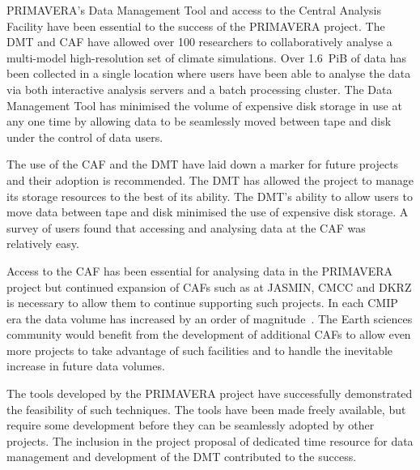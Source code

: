 \documentclass[gmd, manuscript]{copernicus}
\begin{document}
\conclusions  %

PRIMAVERA's Data Management Tool and access to the Central Analysis Facility have been essential to the success of the PRIMAVERA project. The DMT and CAF have allowed over 100 researchers to collaboratively analyse a multi-model high-resolution set of climate simulations. Over 1.6~PiB of data has been collected in a single location where users have been able to analyse the data via both interactive analysis servers and a batch processing cluster. The Data Management Tool has minimised the volume of expensive disk storage in use at any one time by allowing data to be seamlessly moved between tape and disk under the control of data users.

The use of the CAF and the DMT have laid down a marker for future projects and their adoption is recommended. The DMT has allowed the project to manage its storage resources to the best of its ability. The DMT's ability to allow users to move data between tape and disk minimised the use of expensive disk storage. A survey of users found that accessing and analysing data at the CAF was relatively easy.

Access to the CAF has been essential for analysing data in the PRIMAVERA project but continued expansion of CAFs such as at JASMIN, CMCC and DKRZ is necessary to allow them to continue supporting such projects. In each CMIP era the data volume has increased by an order of magnitude~\citep{gmd-11-3659-2018}. The Earth sciences community would benefit from the development of additional CAFs to allow even more projects to take advantage of such facilities and to handle the inevitable increase in future data volumes.

The tools developed by the PRIMAVERA project have successfully demonstrated the feasibility of such techniques. The tools have been made freely available, but require some development before they can be seamlessly adopted by other projects. The inclusion in the project proposal of dedicated time resource for data management and development of the DMT contributed to the success.


\end{document}
